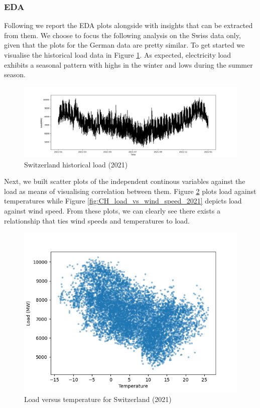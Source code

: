 \subsubsection{EDA}
Following we report the EDA plots alongside with insights that can be extracted from them. We choose to focus the following analysis on the Swiss data only, given that the plots for the German data are pretty similar.
To get started we visualise the historical load data in Figure \ref{fig:CH_historical_load_2021}. As expected, electricity load exhibits a seasonal pattern with highs in the winter and lows during the summer season.
\begin{figure}[!h]
    \includegraphics[width=\textwidth]{images/CH_historical_load_2021.png}
    \caption{Switzerland historical load (2021)}
    \label{fig:CH_historical_load_2021}
\end{figure}
Next, we built scatter plots of the independent continous variables against the load as means of visualising correlation between them.
Figure \ref{fig:CH_load_vs_temperature_2021} plots load against temperatures while Figure \ref{fig:CH_load_vs_wind_speed_2021} depicts load against wind speed. From these plots, we can clearly see there exists a relationship that ties wind speeds and temperatures to load.

\begin{figure}[!h]
    \includegraphics[width=\textwidth]{images/CH_load_vs_temperature_2021.png}
    \caption{Load versus temperature for Switzerland (2021)}
    \label{fig:CH_load_vs_temperature_2021}
\end{figure}

